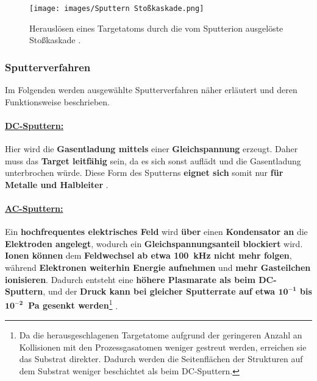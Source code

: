 \documentclass{article} %
\begin{document}
\begin{figure}[htb!]
    \centering
    \texttt{[image: images/Sputtern Stoßkaskade.png]} %
    \captionsetup{labelfont=bf} %
    \caption{Herauslösen eines Targetatoms durch die vom Sputterion ausgelöste Stoßkaskade \cite{keplinger2024}.}
    \label{fig:Sputtern Stosskaskade}
\end{figure}

\vspace{1em}
\subsubsection{Sputterverfahren} %
Im Folgenden werden ausgewählte Sputterverfahren näher erläutert und deren Funktionsweise beschrieben.

\vspace{1em}
\paragraph{\uline{DC-Sputtern:}} Hier wird die \textbf{Gasentladung mittels} einer \textbf{Gleichspannung} erzeugt. Daher muss das \textbf{Target 
leitfähig} sein, da es sich sonst auflädt und die Gasentladung unterbrochen würde. Diese Form des Sputterns \textbf{eignet sich} somit nur 
\textbf{für Metalle und Halbleiter} \cite{keplinger2024}.

\vspace{1em}
\paragraph{\uline{AC-Sputtern:}} Ein \textbf{hochfrequentes elektrisches Feld} wird \textbf{über} einen \textbf{Kondensator an} die \textbf{Elektroden 
angelegt}, wodurch ein \textbf{Gleichspannungsanteil blockiert} wird. \textbf{Ionen können} dem \textbf{Feldwechsel ab etwa 100~kHz nicht mehr 
folgen}, während \textbf{Elektronen weiterhin Energie aufnehmen} und \textbf{mehr Gasteilchen ionisieren}. Dadurch entsteht eine \textbf{höhere 
Plasmarate als beim DC-Sputtern}, und der \textbf{Druck kann bei gleicher Sputterrate auf etwa $\mathbf{10^{-1}}$ bis $\mathbf{10^{-2}}$~Pa 
gesenkt werden}\footnote{Da die herausgeschlagenen Targetatome aufgrund der geringeren Anzahl an Kollisionen mit den Prozessgasatomen weniger 
gestreut werden, erreichen sie das Substrat direkter. Dadurch werden die Seitenflächen der Strukturen auf dem Substrat weniger beschichtet als 
beim DC-Sputtern.} \cite{keplinger2024}. \\
\end{document}
